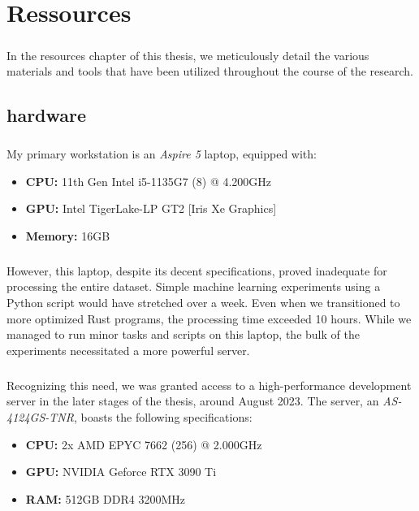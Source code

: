 \chapter{Ressources}\label{chap:ressources}

\paragraph{}In the resources chapter of this thesis, we meticulously detail the various materials and tools that have been utilized throughout the course of the research. 

\section{hardware}
\paragraph{}My primary workstation is an \textit{Aspire 5} laptop, equipped with:
\begin{itemize}
    \item \textbf{CPU:} 11th Gen Intel i5-1135G7 (8) @ 4.200GHz 
    \item \textbf{GPU:} Intel TigerLake-LP GT2 [Iris Xe Graphics]
    \item \textbf{Memory:} 16GB
\end{itemize}
\paragraph{}However, this laptop, despite its decent specifications, proved inadequate for processing the entire dataset. Simple machine learning experiments using a Python script would have stretched over a week. Even when we transitioned to more optimized Rust programs, the processing time exceeded 10 hours. While we managed to run minor tasks and scripts on this laptop, the bulk of the experiments necessitated a more powerful server.

\paragraph{}Recognizing this need, we was granted access to a high-performance development server in the later stages of the thesis, around August 2023. The server, an \textit{AS-4124GS-TNR}, boasts the following specifications:
\begin{itemize}
    \item \textbf{CPU:} 2x AMD EPYC 7662 (256) @ 2.000GHz
    \item \textbf{GPU:} NVIDIA Geforce RTX 3090 Ti
    \item \textbf{RAM:} 512GB DDR4 3200MHz
\end{itemize}
